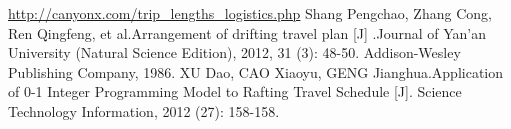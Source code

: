 \newpage
\begin{thebibliography}{99}
\url{http://canyonx.com/trip_lengths_logistics.php}
Shang Pengchao, Zhang Cong, Ren Qingfeng, et al.Arrangement of drifting travel plan [J] .Journal of Yan'an University (Natural Science Edition), 2012, 31 (3): 48-50.
Addison-Wesley Publishing Company, 1986.
XU Dao, CAO Xiaoyu, GENG Jianghua.Application of 0-1 Integer Programming Model to Rafting Travel Schedule [J]. Science Technology Information, 2012 (27): 158-158.
\end{thebibliography}